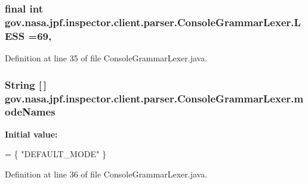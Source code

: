 \subsubsection[{\texorpdfstring{L\+E\+SS}{LESS}}]{\setlength{\rightskip}{0pt plus 5cm}final int gov.\+nasa.\+jpf.\+inspector.\+client.\+parser.\+Console\+Grammar\+Lexer.\+L\+E\+SS =69\hspace{0.3cm}{\ttfamily [static]}, {\ttfamily [package]}}\hypertarget{classgov_1_1nasa_1_1jpf_1_1inspector_1_1client_1_1parser_1_1_console_grammar_lexer_a311c01448cb06da192ca9349cfae884d}{}\label{classgov_1_1nasa_1_1jpf_1_1inspector_1_1client_1_1parser_1_1_console_grammar_lexer_a311c01448cb06da192ca9349cfae884d}


Definition at line 35 of file Console\+Grammar\+Lexer.\+java.

\subsubsection[{\texorpdfstring{mode\+Names}{modeNames}}]{\setlength{\rightskip}{0pt plus 5cm}String \mbox{[}$\,$\mbox{]} gov.\+nasa.\+jpf.\+inspector.\+client.\+parser.\+Console\+Grammar\+Lexer.\+mode\+Names\hspace{0.3cm}{\ttfamily [static]}}\hypertarget{classgov_1_1nasa_1_1jpf_1_1inspector_1_1client_1_1parser_1_1_console_grammar_lexer_a79c22f56202a04f73a2617e7ed3fb432}{}\label{classgov_1_1nasa_1_1jpf_1_1inspector_1_1client_1_1parser_1_1_console_grammar_lexer_a79c22f56202a04f73a2617e7ed3fb432}
{\bfseries Initial value\+:}
\begin{DoxyCode}
= \{
    \textcolor{stringliteral}{"DEFAULT\_MODE"}
  \}
\end{DoxyCode}


Definition at line 36 of file Console\+Grammar\+Lexer.\+java.

